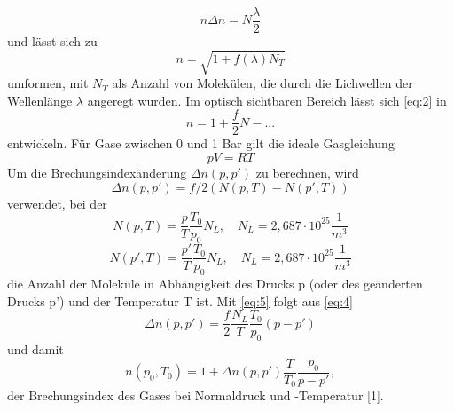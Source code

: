 \begin{equation}
  n\Delta n =N\frac{\lambda}{2} \nonumber
\end{equation}
und lässt sich zu 
\begin{equation}
  n=\sqrt{1+f(\lambda)N_{T}}
  \label{eq:2}
\end{equation}
umformen, mit $N_{T}$ als Anzahl von Molekülen, die durch die Lichwellen der Wellenlänge $\lambda$ angeregt wurden. Im optisch sichtbaren Bereich lässt sich \eqref{eq:2} in
\begin{equation}
  n=1+\frac{f}{2}N-... \nonumber
\end{equation}
entwickeln. Für Gase zwischen 0 und 1 Bar gilt die ideale Gasgleichung
\begin{equation}
  pV=RT 
  \label{eq:3}
\end{equation}
Um die Brechungsindexänderung $\Delta n(p,p')$ zu berechnen, wird 
\begin{equation}
  \Delta n(p,p')=f/2(N(p,T)-N(p',T))
  \label{eq:4}
\end{equation}
verwendet, bei der 
\begin{equation}
  N(p,T)=\frac{p}{T}\frac{T_{0}}{p_{0}}N_{L}, \quad N_{L}=2,687\cdot 10^25\frac{1}{m^3} \nonumber
\end{equation}
\begin{equation}
  N(p',T)=\frac{p'}{T}\frac{T_{0}}{p_{0}}N_{L}, \quad N_{L}=2,687\cdot 10^25\frac{1}{m^3}
  \label{eq:5}
\end{equation}
die Anzahl der Moleküle in Abhängigkeit des Drucks p (oder des geänderten Drucks p') und der Temperatur T ist.
Mit \eqref{eq:5} folgt aus \eqref{eq:4}
\begin{equation}
  \Delta n(p,p')=\frac{f}{2}\frac{N_{L}}{T}\frac{T_{0}}{p_{0}}(p-p') 
  \label{eq:5}
\end{equation}
und damit
\begin{equation}
  n(p_{0},T_{0})=1+\Delta n(p,p')\frac{T}{T_{0}}\frac{p_0}{p-p'},
  \label{eq:6}
\end{equation}
der Brechungsindex des Gases bei Normaldruck und -Temperatur [1].
